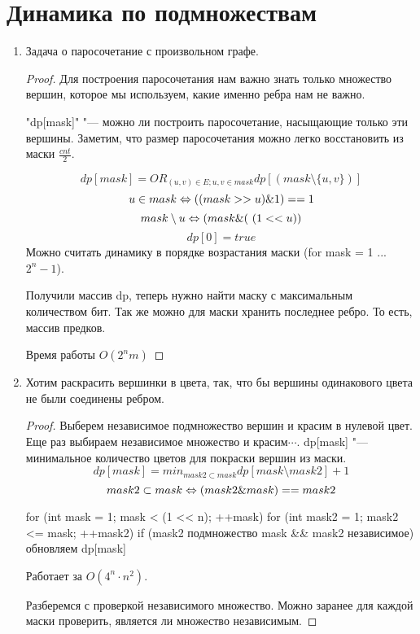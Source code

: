 \section{Динамика по подмножествам}
\begin{enumerate}
\item 
Задача о паросочетание с произвольном графе. 

\begin{proof}
    Для построения паросочетания нам важно знать только множество вершин, которое мы используем, какие именно ребра нам не важно. 

    \cpp"dp[mask]" "--- можно ли построить паросочетание, насыщающие только эти вершины. Заметим, что размер паросочетания можно 
    легко восстановить из маски $\frac{cnt}{2}$.

    $$dp[mask] = OR_{(u, v) \in E; u, v \in mask} dp[(mask \setminus \{u, v\})]$$
    $$u \in mask \Leftrightarrow ((mask >> u)\&1) == 1$$
    $$mask \setminus u \Leftrightarrow (mask \& (~(1 << u))$$
    $$dp[0] = true$$
    Можно считать динамику в порядке возрастания маски (for mask = 1 ... $2^n - 1$).

    Получили массив dp, теперь нужно найти маску с максимальным количеством бит. Так же можно для маски хранить последнее ребро. То есть, 
    массив предков. 

    Время работы $O(2^n m)$
\end{proof}
\item Хотим раскрасить вершинки в цвета, так, что бы вершины одинакового цвета не 
были соединены ребром. 
\begin{proof}
    Выберем независимое подмножество вершин и красим в нулевой цвет. Еще раз выбираем независимое множество и красим$\cdots$.
    dp[mask] "--- минимальное количество цветов для покраски вершин из маски.
    $$dp[mask] = min_{mask2 \subset mask} dp[mask \setminus mask2] + 1$$
    $$mask2 \subset mask \Leftrightarrow (mask2 \& mask)== mask2$$

    \begin{cppcode}
    for (int mask = 1; mask < (1 << n); ++mask) {
        for (int mask2 = 1; mask2 <= mask; ++mask2) {
            if (mask2 подмножество mask && mask2 независимое) {
                обновляем dp[mask]    
            }
        }
    }
    \end{cppcode}

    Работает за $O(4^n \cdot n^2)$.

    Разберемся с проверкой независимого множество. Можно заранее для каждой маски проверить, является ли множество независимым. 


\end{proof}
\end{enumerate}
